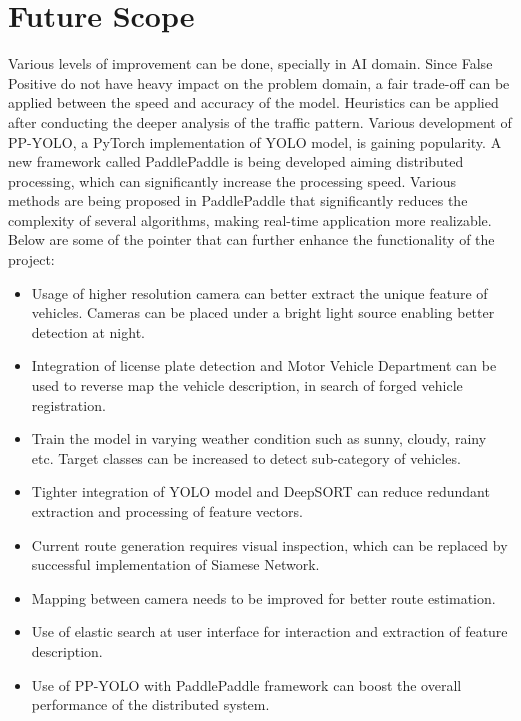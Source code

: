 \section{Future Scope}
Various levels of improvement can be done, specially in AI domain. Since False Positive do not have heavy impact on the problem domain, a fair trade-off can be applied between the speed and accuracy of the model. Heuristics can be applied after conducting the deeper analysis of the traffic pattern. Various development of PP-YOLO, a PyTorch implementation of YOLO model, is gaining popularity. A new framework called PaddlePaddle \cite{paddlepaddle} is being developed aiming distributed processing, which can significantly increase the processing speed. Various methods are being proposed in PaddlePaddle that significantly reduces the complexity of several algorithms, making real-time application more realizable. Below are some of the pointer that can further enhance the functionality of the project:
\begin{itemize}
	\item Usage of higher resolution camera can better extract the unique feature of vehicles. Cameras can be placed under a bright light source enabling better detection at night.
	\item Integration of license plate detection and Motor Vehicle Department can be used to reverse map the vehicle description, in search of forged vehicle registration.
	\item Train the model in varying weather condition such as sunny, cloudy, rainy etc. Target classes can be increased to detect sub-category of vehicles.
	\item Tighter integration of YOLO model and DeepSORT can reduce redundant extraction and processing of feature vectors.
	\item Current route generation requires visual inspection, which can be replaced by successful implementation of Siamese Network.
	\item Mapping between camera needs to be improved for better route estimation.
	\item Use of elastic search at user interface for interaction and extraction of feature description.
	\item Use of PP-YOLO with PaddlePaddle framework can boost the overall performance of the distributed system.
\end{itemize}